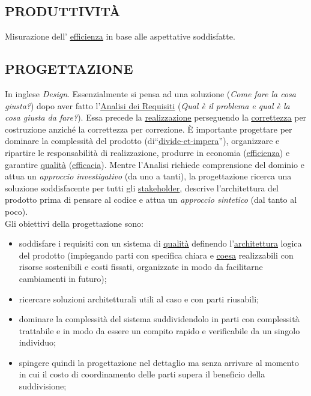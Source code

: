 		\subsection{PRODUTTIVITÀ}  \label{produttivita}
		Misurazione dell' \underline{\hyperref[efficienza]{efficienza}} in base alle aspettative soddisfatte.
		
		\subsection{PROGETTAZIONE}  \label{progettazione} %
		In inglese \textit{Design}. Essenzialmente si pensa ad una soluzione (\textit{Come fare la cosa giusta?}) dopo aver fatto l'\underline{\hyperref[analisideirequisiti]{Analisi dei Requisiti}} (\textit{Qual è il problema e qual è la cosa giusta da fare?}). Essa precede la \underline{\hyperref[realizzazione]{realizzazione}} perseguendo la \underline{\hyperref[correttezza]{correttezza}} per costruzione anziché la correttezza per correzione. È importante progettare per dominare la complessità del prodotto (di“\underline{\hyperref[divideetimpera]{divide-et-impera}}”), organizzare e ripartire le responsabilità di realizzazione, produrre in economia (\underline{\hyperref[efficienza]{efficienza}}) e garantire \underline{\hyperref[qualita]{qualità}} (\underline{\hyperref[efficacia]{efficacia}}). Mentre l'Analisi richiede comprensione del dominio e attua un \textit{approccio investigativo} (da uno a tanti), la progettazione ricerca una soluzione soddisfacente per tutti gli \underline{\hyperref[stakeholder]{stakeholder}}, descrive l'architettura del prodotto prima di pensare al codice e attua un \textit{approccio sintetico} (dal tanto al poco). \\
		
		Gli obiettivi della progettazione sono: 
		\begin{itemize}
			\item soddisfare i requisiti con un sistema di \underline{\hyperref[qualita]{qualità}} definendo l'\underline{\hyperref[architettura]{architettura}} logica del prodotto (impiegando parti con specifica chiara e \underline{\hyperref[coeso]{coesa}} realizzabili con risorse sostenibili e costi fissati, organizzate in modo da facilitarne cambiamenti in futuro);
			\item ricercare soluzioni architetturali utili al caso e con parti riusabili;
			\item  dominare la complessità del sistema suddividendolo in parti con complessità trattabile e in modo da essere un compito rapido e verificabile da un singolo individuo;
			\item spingere quindi la progettazione nel dettaglio ma senza arrivare al momento in cui il costo di coordinamento delle parti supera il beneficio della suddivisione; 
		\end{itemize}
	
